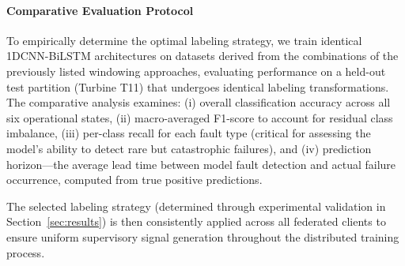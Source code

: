 \documentclass[12pt]{article}
\begin{document}
\paragraph{Comparative Evaluation Protocol}
To empirically determine the optimal labeling strategy, we train identical 1DCNN-BiLSTM architectures on datasets derived from the combinations of the previously listed windowing approaches, evaluating performance on a held-out test partition (Turbine T11) that undergoes identical labeling transformations. The comparative analysis examines: (i) overall classification accuracy across all six operational states, (ii) macro-averaged F1-score to account for residual class imbalance, (iii) per-class recall for each fault type (critical for assessing the model's ability to detect rare but catastrophic failures), and (iv) prediction horizon—the average lead time between model fault detection and actual failure occurrence, computed from true positive predictions.

The selected labeling strategy (determined through experimental validation in Section~\ref{sec:results}) is then consistently applied across all federated clients to ensure uniform supervisory signal generation throughout the distributed training process.



\end{document}
